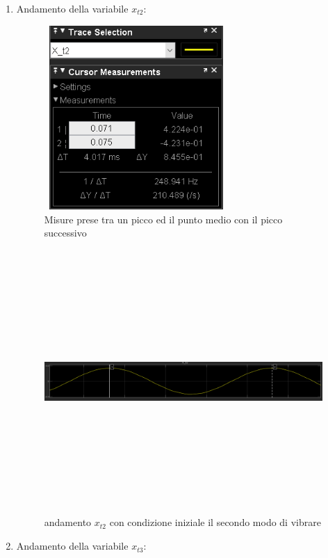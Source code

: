 \documentclass{article}
\begin{document}
\begin{enumerate}
    \item
     Andamento della variabile $x_{t2}$:
\begin{figure}[H]
\centering
\includegraphics[width=7cm,height=7cm,keepaspectratio]{./simulink/assex/modo2_t2tab.png}
\caption{Misure prese tra un picco ed il punto medio con il picco successivo}
\end{figure}

\begin{figure}[H]
\centering
\includegraphics[width=12cm,height=10cm,keepaspectratio]{./simulink/assex/modo2_t2.png}
\caption{andamento $x_{t2}$ con condizione iniziale il secondo modo di vibrare}
\end{figure}
      
    \item 
Andamento della variabile $x_{t3}$:


\end{enumerate}
\end{document}
